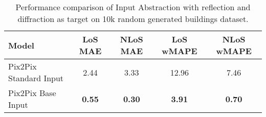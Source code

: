 		\begin{table}[h!]
			\centering
			\begin{tabular}{|l|c|c|c|c|}
				\hline
				\textbf{Model} & \textbf{LoS MAE} & \textbf{NLoS MAE} & \textbf{LoS wMAPE} & \textbf{NLoS wMAPE} \\
				\hline
				Pix2Pix Standard Input & 2.44 & 3.33 & 12.96 & 7.46 \\
				Pix2Pix Base Input & \textbf{0.55} & \textbf{0.30} & \textbf{3.91} & \textbf{0.70} \\
				\hline
			\end{tabular}
			\caption{Performance comparison of Input Abstraction with reflection and diffraction as target on 10k random generated buildings dataset.}
			\label{tab:performance_input_ref_diff}
		\end{table}
		
		
		
		

